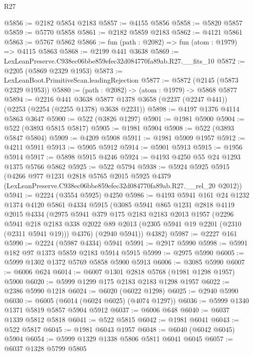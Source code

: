 \begin{lexlean}{R27}
\begin{coremodule}
@5856 := @2182 @5854 @2183
@5857 := @4155 @5856
@5858 := @5820 @5857
@5859 := @5770 @5858
@5861 := @2182 @5859 @2183
@5862 := @4121 @5861
@5863 := @5767 @5862
@5866 := fun (path : @2082) => fun (atom : @1979) => @4115 @5863
@5868 := @2199 @441 @3638
@5869 := LexLeanPreserve.C938ec06bbe859efec32d084770fa89ab.R27.__fits_10
@5872 := @2205 (@5869 @2329 @1953)
@5873 := LexLeanBoot.PrimitiveScan.leadingRejection
@5877 := @5872 (@2145 (@5873 @2329 @1953))
@5880 := (path : @2082) -> (atom : @1979) -> @5868 @5877
@5894 := @2216
    @441
    @3638
    @5877
    @1378
    @3658
    (@2237 (@2247 @441))
    (@2253 (@2254 (@2255 @1378) @3638 @2231))
@5898 := @4197 @1376 @4114 @5863 @3647
@5900 := @522 (@3826 @1297)
@5901 := @1981 @5900
@5904 := @522 (@3893 @5815 @5817)
@5905 := @1981 @5904
@5908 := @522 (@3893 @5847 @5804)
@5909 := @4209 @5908
@5911 := @1981 @5909 @1957
@5912 := @4211 @5911
@5913 := @5905 @5912
@5914 := @5901 @5913
@5915 := @1956 @5914
@5917 := @5898 @5915 @4246
@5924 := @4193 @4250 @55 @24 @1293 @1375 @5766 @5862
@5925 := @522 @5794
@5938 := @5924
    @5925
    @5915
    (@4266
      @977
      @1231
      @2818
      @5765
      @2015
      @5925
      @4379
      (LexLeanPreserve.C938ec06bbe859efec32d084770fa89ab.R27.__rel_20 @2012))
@5941 := @2224 (@3554 @5925) @4250
@5986 := @4193
    @5941
    @161
    @24
    @1232
    @1374
    @4120
    @5861
    @4334
    @5915
    (@3085
      @5941
      @865
      @1231
      @2818
      @4119
      @2015
      @4334
      (@2975
        @5941
        @379
        @175
        @2183
        @2183
        @2013
        @1957
        (@2296
          @5941
          @218
          @2183
          @338
          @2022
          @89
          @2013
          (@2305 @5941 @19 @2201 (@2310 (@2311 @5941 @19)))
          @4376)
        (@2940 @5941))
      @4382)
@5987 := @2227 @161
@5990 := @2224 (@5987 @4334) @5941
@5991 := @2917 @5990
@5998 := @5991 @182 @97 @1373 @5859 @2183 @5914 @5915
@5999 := @2975 @5990
@6005 := @5999 @1302 @1372 @5769 @5858 @5900 @5913
@6006 := @3085 @5990
@6007 := @6006 @624
@6014 := @6007 @1301 @2818 @5768 (@1981 @1298 @1957) @5900
@6020 := @5999 @1299 @175 @2183 @2183 @1298 @1957
@6022 := @2386 @5990 @1218
@6024 := @6020 (@6022 @1298)
@6025 := @2940 @5990
@6030 := @6005 (@6014 (@6024 @6025) (@4074 @1297))
@6036 := @5999 @1340 @1371 @5819 @5857 @5904 @5912
@6037 := @6006 @648
@6040 := @6037 @1339 @5812 @5818
@6041 := @522 @5815
@6042 := @1981 @6041
@6043 := @522 @5817
@6045 := @1981 @6043 @1957
@6048 := @6040 (@6042 @6045) @5904
@6054 := @5999 @1329 @1338 @5806 @5811 @6041 @6045
@6057 := @6037 @1328 @5799 @5805

\end{coremodule}
\end{lexlean}
